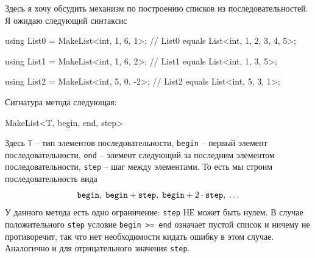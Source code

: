Здесь я хочу обсудить механизм по построению списков из последовательностей.
Я ожидаю следующий синтаксис
\begin{cppcode}
using List0 = MakeList<int, 1, 6, 1>;
// List0 equals List<int, 1, 2, 3, 4, 5>;

using List1 = MakeList<int, 1, 6, 2>;
// List1 equals List<int, 1, 3, 5>;

using List2 = MakeList<int, 5, 0, -2>;
// List2 equals List<int, 5, 3, 1>;
\end{cppcode}
Сигнатура метода следующая:
\begin{cppcode}
MakeList<T, begin, end, step>
\end{cppcode}
Здесь \verb"T" -- тип элементов последовательности, \verb"begin" -- первый элемент последовательности, \verb"end" -- элемент следующий за последним элементом последовательности, \verb"step" -- шаг между элементами.
То есть мы строим последовательность вида
\[
\verb"begin",\; \verb"begin" + \verb"step",\; \verb"begin" + 2 \cdot \verb"step",\; \ldots
\]
У данного метода есть одно ограничение: \verb"step" НЕ может быть нулем.
В случае положительного \verb"step" условие \verb"begin >= end" означает пустой список и ничему не противоречит, так что нет необходимости кидать ошибку в этом случае.
Аналогично и для отрицательного значения \verb"step".

